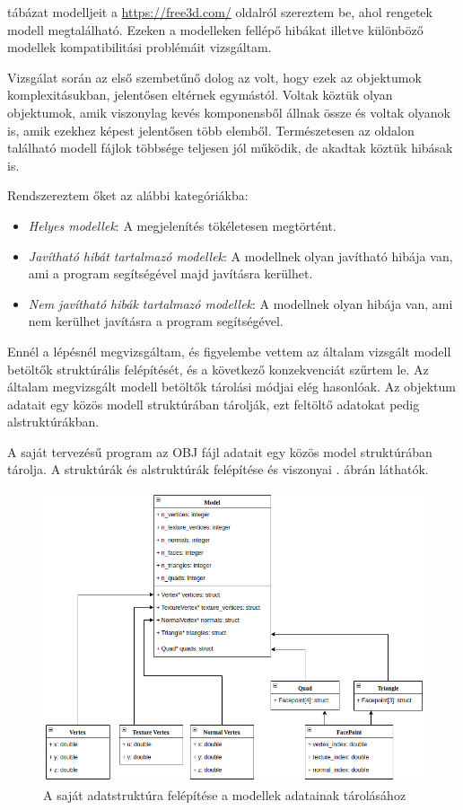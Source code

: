  tábázat modelljeit a \url{https://free3d.com/} oldalról szereztem be, ahol rengetek modell megtalálható. Ezeken a modelleken fellépő hibákat illetve különböző modellek kompatibilitási problémáit vizsgáltam.

Vizsgálat során az első szembetűnő dolog az volt, hogy ezek az objektumok komplexitásukban, jelentősen eltérnek egymástól. Voltak köztük olyan objektumok, amik viszonylag kevés komponensből állnak össze és voltak olyanok is, amik ezekhez képest jelentősen több elemből.
Természetesen az oldalon található modell fájlok többsége teljesen jól működik, de akadtak köztük hibásak is.

Rendszereztem őket az alábbi kategóriákba:
\begin{itemize}
\item \textit{Helyes modellek}:
A megjelenítés tökéletesen megtörtént.
\item \textit{Javítható hibát tartalmazó modellek}:
A modellnek olyan javítható hibája van, ami a program segítségével majd javításra kerülhet.
\item \textit{Nem javítható hibák tartalmazó modellek}:
A modellnek olyan hibája van, ami nem kerülhet javításra a program segítségével.
\end{itemize}
\bigskip
\newpage
{}

Ennél a lépésnél megvizsgáltam, és figyelembe vettem az általam vizsgált modell betöltők struktúrális felépítését, és a következő konzekvenciát szűrtem le.
Az általam megvizsgált modell betöltők tárolási módjai elég hasonlóak. Az objektum adatait egy közös modell struktúrában tárolják, ezt feltöltő adatokat pedig alstruktúrákban.

A saját tervezésű program az OBJ fájl adatait egy közös model struktúrában tárolja. A struktúrák és alstruktúrák felépítése és viszonyai . ábrán láthatók.

\begin{figure}[h]
\centering
\includegraphics[width=\textwidth]{images/struct.png}
\caption{A saját adatstruktúra felépítése a modellek adatainak tárolásához}
\label{fig:struct}
\end{figure}


